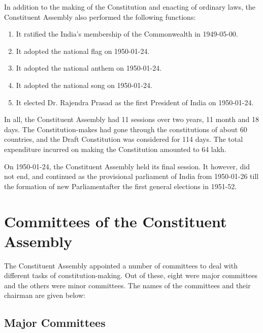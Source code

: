 \begin{multicol}{2}
In addition to the making of the Constitution and enacting of ordinary laws, the Constituent Assembly also performed the following functions:

\begin{enumerate}
  \item It ratified the India's membership of the Commonwealth in 1949-05-00.
  \item It adopted the national flag on 1950-01-24.
  \item It adopted the national anthem on 1950-01-24.
  \item It adopted the national song on 1950-01-24.
  \item It elected Dr. Rajendra Prasad as the first President of India on 1950-01-24.
\end{enumerate}

In all, the Constituent Assembly had 11 sessions over two years, 11 month and 18 days. The Constitution-makes had gone through the constitutions of about 60 countries, and the Draft Constitution was considered for 114 days. The total expenditure incurred on making the Constitution amounted to 64 lakh.

On 1950-01-24, the Constituent Assembly held its final session. It however, did not end, and continued as the provisional parliament of India from 1950-01-26 till the formation of new Parliament\endnote after the first general elections in 1951-52.

\section{Committees of the Constituent Assembly}

The Constituent Assembly appointed a number of committees to deal with different tasks of constitution-making. Out of these, eight were major committees and the others were minor committees. The names of the committees and their chairman are given below:

\subsection{Major Committees}


\end{multicol}
